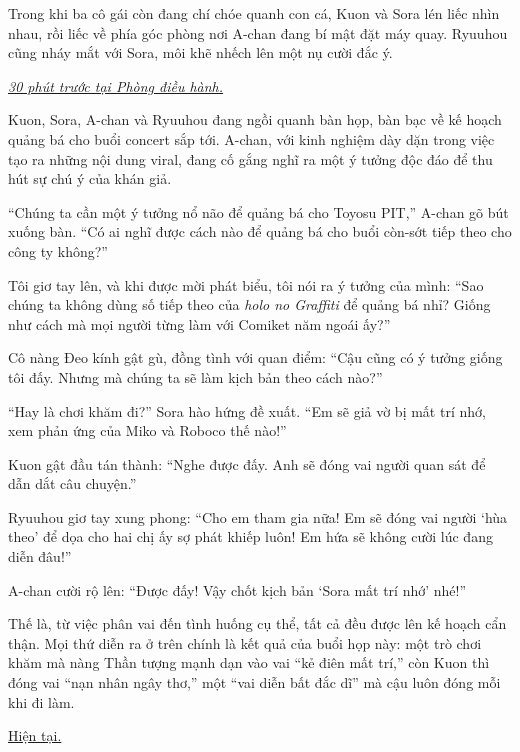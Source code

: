 \documentclass[../main.tex]{subfiles}
\begin{document}

Trong khi ba cô gái còn đang chí chóe quanh con cá, Kuon và Sora lén liếc nhìn nhau, rồi liếc về phía góc phòng nơi A-chan đang bí mật đặt máy quay. Ryuuhou cũng nháy mắt với Sora, môi khẽ nhếch lên một nụ cười đắc ý.

\begin{center}
  \textit{\uline{30 phút trước tại Phòng điều hành.}}
\end{center}

Kuon, Sora, A-chan và Ryuuhou đang ngồi quanh bàn họp, bàn bạc về kế hoạch quảng bá cho buổi concert sắp tới. A-chan, với kinh nghiệm dày dặn trong việc tạo ra những nội dung viral, đang cố gắng nghĩ ra một ý tưởng độc đáo để thu hút sự chú ý của khán giả.

``Chúng ta cần một ý tưởng nổ não để quảng bá cho Toyosu PIT,'' A-chan gõ bút xuống bàn. ``Có ai nghĩ được cách nào để quảng bá cho buổi còn-sớt tiếp theo cho công ty không?''

Tôi giơ tay lên, và khi được mời phát biểu, tôi nói ra ý tưởng của mình: ``Sao chúng ta không dùng số tiếp theo của \textit{holo no Graffiti} để quảng bá nhỉ? Giống như cách mà mọi người từng làm với Comiket năm ngoái ấy?''

Cô nàng Đeo kính gật gù, đồng tình với quan điểm: ``Cậu cũng có ý tưởng giống tôi đấy. Nhưng mà chúng ta sẽ làm kịch bản theo cách nào?''

``Hay là chơi khăm đi?'' Sora hào hứng đề xuất. ``Em sẽ giả vờ bị mất trí nhớ, xem phản ứng của Miko và Roboco thế nào!''

Kuon gật đầu tán thành: ``Nghe được đấy. Anh sẽ đóng vai người quan sát để dẫn dắt câu chuyện.''

Ryuuhou giơ tay xung phong: ``Cho em tham gia nữa! Em sẽ đóng vai người `hùa theo' để dọa cho hai chị ấy sợ phát khiếp luôn! Em hứa sẽ không cười lúc đang diễn đâu!''

A-chan cười rộ lên: ``Được đấy! Vậy chốt kịch bản `Sora mất trí nhớ' nhé!''

Thế là, từ việc phân vai đến tình huống cụ thể, tất cả đều được lên kế hoạch cẩn thận. Mọi thứ diễn ra ở trên chính là kết quả của buổi họp này: một trò chơi khăm mà nàng Thần tượng mạnh dạn vào vai ``kẻ điên mất trí,'' còn Kuon thì đóng vai ``nạn nhân ngây thơ,'' một ``vai diễn bất đắc dĩ'' mà cậu luôn đóng mỗi khi đi làm.

\ct

\begin{center}
  \uline{Hiện tại.}
\end{center}
\end{document}
